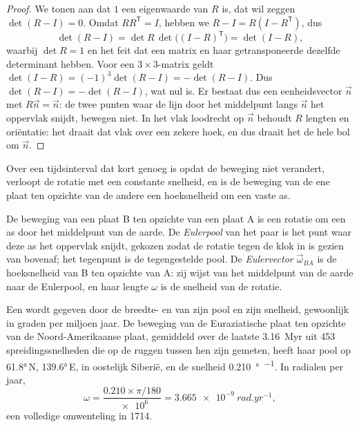 \begin{proof}
We tonen aan dat $1$ een eigenwaarde van $R$ is, dat wil zeggen $\det(R - I) = 0$. Omdat $R R^{\mathsf T} = I$, hebben we $R - I = R(I - R^{\mathsf T})$, dus
\[
  \det(R - I) = \det R\,\det\bigl((I - R)^{\mathsf T}\bigr) = \det(I - R),
\]
waarbij $\det R = 1$ en het feit dat een matrix en haar getransponeerde dezelfde determinant hebben. Voor een $3\times3$-matrix geldt
$\det(I - R) = (-1)^3\det(R - I) = -\det(R - I)$. Dus $\det(R - I) =
-\det(R - I)$, wat nul is. Er bestaat dus een eenheidsvector $\vec n$ met $R\vec n = \vec n$: de twee punten waar de lijn door het middelpunt langs $\vec n$ het oppervlak snijdt, bewegen niet. In het vlak loodrecht op $\vec n$ behoudt $R$ lengten en oriëntatie: het draait dat vlak over een zekere hoek, en dus draait het de hele bol om $\vec n$.
\end{proof}

Over een tijdsinterval dat kort genoeg is opdat de beweging niet verandert, verloopt de rotatie met een constante snelheid, en is de beweging van de ene plaat ten opzichte van de andere een hoeksnelheid om een vaste as.

\begin{definition}\label{def:b1:plate-kinematics:euler-pole}
De beweging van een plaat B ten opzichte van een plaat A is een rotatie om een as door het middelpunt van de aarde. De \emph{Eulerpool} van het paar is het punt waar deze as het oppervlak snijdt, gekozen zodat de rotatie tegen de klok in is gezien van bovenaf; het tegenpunt is de tegengestelde pool. De \emph{Eulervector} $\vec\omega_{BA}$ is de hoeksnelheid van B ten opzichte van A: zij wijst van het middelpunt van de aarde naar de Eulerpool, en haar lengte $\omega$ is de snelheid van de rotatie.
\end{definition}

Een  wordt gegeven door de breedte- en  van zijn pool en zijn snelheid, gewoonlijk in graden per miljoen jaar. De beweging van de Euraziatische plaat ten opzichte van de Noord-Amerikaanse plaat, gemiddeld over de laatste \qty{3.16}{Myr} uit 453 spreidingssnelheden die op de ruggen tussen hen zijn gemeten, heeft haar pool op \ang{61.8}\,N, \ang{139.6}\,E, in oostelijk Siberië, en de snelheid \qty{0.210}{\degree\per\Myr}. In radialen per jaar,
\[
  \omega = \frac{0.210\times\pi/180}{\num{e6}} = \qty{3.665e-9}{rad.yr^{-1}},
\]
een volledige omwenteling in \qty{1714}{\Myr}.

